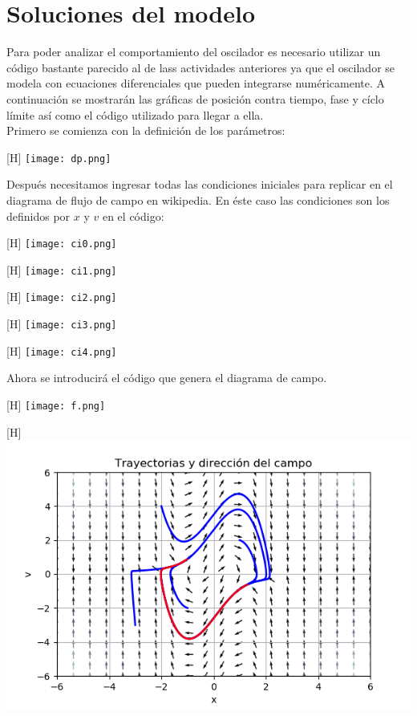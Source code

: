 \documentclass{article}
\begin{document}
\section{Soluciones del modelo}
Para poder analizar el comportamiento del oscilador es necesario utilizar un código bastante parecido al de lass actividades anteriores ya que el oscilador se modela con ecuaciones diferenciales que pueden integrarse numéricamente. A continuación se mostrarán las gráficas de posición contra tiempo, fase y cíclo límite así como el código utilizado para llegar a ella.\\
Primero se comienza con la definición de los parámetros:\\
\begin{center}[H]
	\centering
    \texttt{[image: dp.png]}
\end{center}
Después necesitamos ingresar todas las condiciones iniciales para replicar en el diagrama de flujo de campo en wikipedia. En éste caso las condiciones son los definidos por $x$ y $v$ en el código:\\
\begin{center}[H]
	\centering
    \texttt{[image: ci0.png]}
\end{center}
\begin{center}[H]
	\centering
    \texttt{[image: ci1.png]}
\end{center}
\begin{center}[H]
	\centering
    \texttt{[image: ci2.png]}
\end{center}
\begin{center}[H]
	\centering
    \texttt{[image: ci3.png]}
\end{center}
\begin{center}[H]
	\centering
    \texttt{[image: ci4.png]}
\end{center}
Ahora se introducirá el código que genera el diagrama de campo.\\
\begin{center}[H]
	\centering
    \texttt{[image: f.png]}
\end{center}
\begin{center}[H]
	\centering
    \includegraphics[width=\linewidth]{FasesCondiciones.png}
\end{center}
\end{document}
